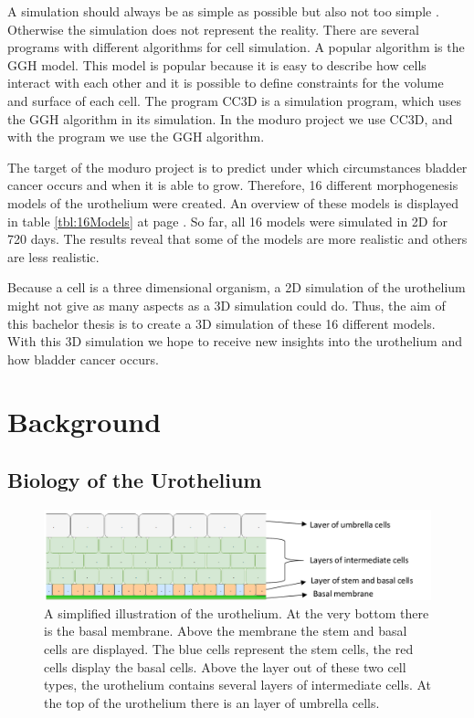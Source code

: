 A simulation should always be as simple as possible but also not too simple \cite{REF}. Otherwise the simulation does not represent the reality. 
There are several programs with different algorithms for cell simulation. A popular algorithm is the \ac{GGH} model. This model is popular because it is easy to describe how cells interact with each other and it is possible to define constraints for the volume and surface of each cell. \newline
The program \ac{CC3D} is a simulation program, which uses the \ac{GGH} algorithm in its simulation. In the moduro project we use \ac{CC3D}, and with the program we use the \ac{GGH} algorithm.

The target of the moduro project is to predict under which circumstances bladder cancer occurs and when it is able to grow. Therefore, 16 different morphogenesis models of the urothelium were created. An overview of these models is displayed in table \ref{tbl:16Models} at page \pageref{tbl:16Models}. So far, all 16 models were simulated in 2D for 720 days. The results reveal that some of the models are more realistic and others are less realistic.

Because a cell is a three dimensional organism, a 2D simulation of the urothelium might not give as many aspects as a 3D simulation could do. Thus, the aim of this bachelor thesis is to create a 3D simulation of these 16 different models. With this 3D simulation we hope to receive new insights into the urothelium and how bladder cancer occurs.

\section{Background}
\subsection{Biology of the Urothelium}

\begin{figure}
	\center
	\includegraphics[scale=0.3]{figures/Urothelium.png}
	\caption{A simplified illustration of the urothelium. At the very bottom there is the basal membrane. Above the membrane the stem and basal cells are displayed. The blue cells represent the stem cells, the red cells display the basal cells. Above the layer out of these two cell types, the urothelium contains several layers of intermediate cells. At the top of the urothelium there is an layer of umbrella cells.}
	\label{img:physiology_urothelium}
\end{figure}

